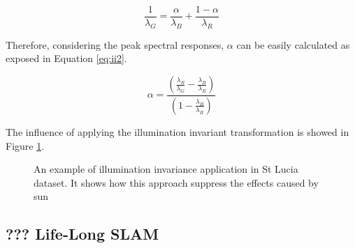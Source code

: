 \begin{equation}
\frac{1}{\lambda_G}=\frac{\alpha}{\lambda_B}+\frac{1-\alpha}{\lambda_R}
\label{eq:ii1}
\end{equation}

Therefore, considering the peak spectral responses, $\alpha$ can be easily calculated as exposed in Equation \ref{eq:ii2}.

\begin{equation}
\alpha=\frac{(\frac{\lambda_B}{\lambda_G}-\frac{\lambda_B}{\lambda_R})}{(1-\frac{\lambda_B}{\lambda_R})}
\label{eq:ii2}
\end{equation}
 
The influence of applying the illumination invariant transformation is showed in Figure \ref{fig:iicompare1}.

\begin{figure}
	\centering
	\caption{An example of illumination invariance application in St Lucia dataset. It shows how this approach suppress the effects caused by sun}
	\label{fig:iicompare1}
\end{figure}

\subsection{??? Life-Long SLAM}

